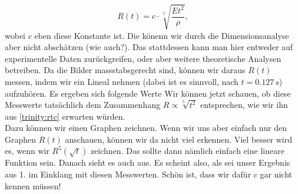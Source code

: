 \begin{Answer}[ref  = trinity]
		\begin{equation}\label{trinity:rtc}
			\boxed{
				R\left(t\right) = c\cdot \sqrt[5]{\frac{Et^2}{\rho}},
				}
		\end{equation}
		wobei $c$ eben diese Konstante ist. Die könenn wir durch die Dimensionsanalyse aber nicht abschätzen (wie auch?). Das stattdessen kann man hier entweder auf experimentelle Daten zurückgreifen, oder aber weitere theoretische Analysen betreiben.
	\Question Da die Bilder massstabsgerecht sind, können wir daraus $R\left(t\right)$ messen, indem wir ein Lineal nehmen (dabei ist es sinnvoll, nach $t=0.127~\mathrm{s}$) aufzuhören. Es ergeben sich folgende Werte
	Wir können jetzt schauen, ob diese Messwerte tatsächlich dem Zusammenhang $R\propto \sqrt[5]{t^2}$ entsprechen, wie wir ihn aus \eqref{trinity:rtc} erwarten würden.\\
	Dazu können wir einen Graphen zeichnen. Wenn wir uns aber einfach nur den Graphen $R\left(t\right)$ anschauen, können wir da nicht viel erkennen.
%	
	 Viel besser wird es, wenn wir $R^5\left(\sqrt{t}\right)$ zeichnen. Das sollte dann nämlich einfach eine lineare Funktion sein. Danach sieht es auch aus.
	 Es scheint also, als sei unser Ergebnis aus 1. im Einklang mit diesen Messwerten. Schön ist, dass wir dafür $c$ gar nicht kennen müssen!
\end{Answer}
